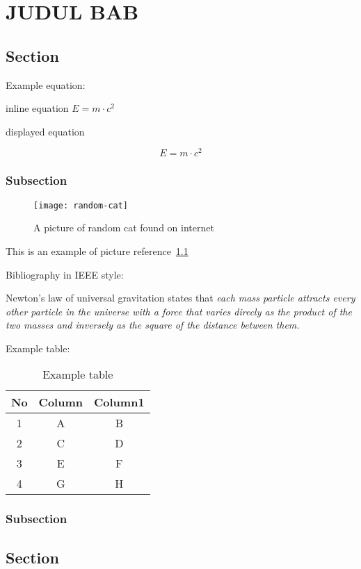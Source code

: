 \chapter{JUDUL BAB}
\section{Section}
\lipsum[1]
Example equation:

inline equation $E=m\cdot c^2$

displayed equation

\begin{equation}
    E=m\cdot c^2
\end{equation}

\subsection{Subsection}

\begin{figure}[H]
    \centering
    \texttt{[image: random-cat]}
    \caption{A picture of random cat found on internet}\label{random-cat}
\end{figure}

This is an example of picture reference~\cref{random-cat}

Bibliography in IEEE style:

Newton's law of universal gravitation states that \textit{each mass particle attracts every other particle in the universe with a force that varies direcly as the product of the two masses and inversely as the square of the distance between them.}~\autocite{book:classical}

Example table:

\begin{table}[H]
    \centering
    \caption{Example table}\label{table1}
    \begin{tabular}{ccc}
        \toprule
        No & Column & Column1 \\
        \midrule
        1  & A      & B       \\
        2  & C      & D       \\
        3  & E      & F       \\
        4  & G      & H       \\
        \bottomrule
    \end{tabular}
\end{table}

\lipsum[1]
\subsection{Subsection}
\lipsum[1]
\section{Section}
\lipsum[2]
